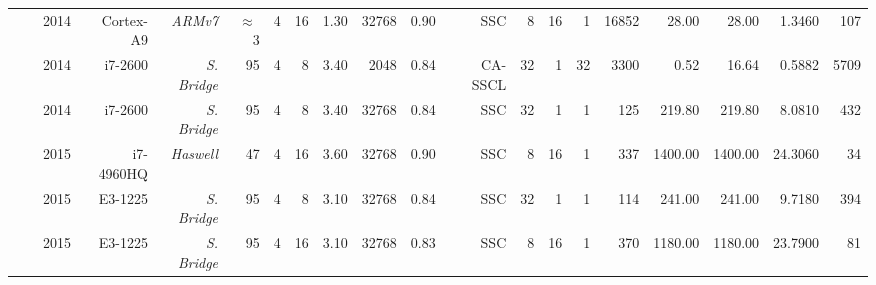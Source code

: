 \begin{table}[htp]
\begin{adjustbox}{angle=90}
{{\begin{tabular}{|r|r r|r r r r r r|r r|r r r r|r r|r r r|}
                                                                 & \cite{LeGal2014}     & 2014          & Cortex-A9          & \textit{ARMv7}     & $\approx~$3  & {\color{Paired-1}4} &  16           & 1.30           & 32768    & 0.90     &      SSC           &  8            &                    16  &  1                &                   16852  &                    28.00  &   28.00       &  1.3460        &    107             \\
                                                                 & \cite{Sarkis2014b}   & 2014          & i7-2600            & \textit{S. Bridge} &          95  & {\color{Paired-1}4} &   8           & 3.40           &  2048    & 0.84     &   CA-SSCL          & 32            &                     1  & 32                &                    3300  &                     0.52  &   16.64       &  0.5882        &   5709             \\
                                                                 & \cite{Sarkis2014}    & 2014          & i7-2600            & \textit{S. Bridge} &          95  & {\color{Paired-1}4} &   8           & 3.40           & 32768    & 0.84     &      SSC           & 32            &                     1  &  1                &                     125  &                   219.80  &  219.80       &  8.0810        &    432             \\
                                                                 & \cite{LeGal2015a}    & 2015          & i7-4960HQ          & \textit{Haswell}   &          47  & {\color{Paired-1}4} &  16           & 3.60           & 32768    & 0.90     &      SSC           &  8            &                    16  &  1                &                     337  &                  1400.00  & 1400.00       & 24.3060        &     34             \\
                                                                 & \cite{Cassagne2015c} & 2015          & E3-1225            & \textit{S. Bridge} &          95  & {\color{Paired-1}4} &   8           & 3.10           & 32768    & 0.84     &      SSC           & 32            &                     1  &  1                &                     114  &                   241.00  &  241.00       &  9.7180        &    394             \\
                                                                 & \cite{Cassagne2015c} & 2015          & E3-1225            & \textit{S. Bridge} &          95  & {\color{Paired-1}4} &  16           & 3.10           & 32768    & 0.83     &      SSC           &  8            &                    16  &  1                &                     370  &                  1180.00  & 1180.00       & 23.7900        &     81             \\

\end{tabular}}}
\end{adjustbox}
\end{table}
